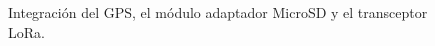 \begin{itemize}
	\begin{figure}[H]
		\centering
		\quad
		\caption{ Integración del GPS, el módulo adaptador MicroSD y el transceptor LoRa.}
	\end{figure}
	

\end{itemize}
